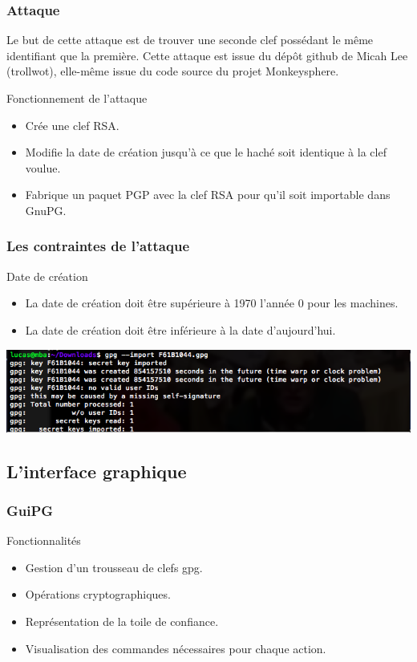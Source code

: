 \begin{frame}
  \frametitle{\color{white}Attaque}
  \begin{block}{ }
  Le but de cette attaque est de trouver une seconde clef possédant le même identifiant que la première. 
  Cette attaque est issue du dépôt github de Micah Lee (trollwot), elle-même issue du code source du projet Monkeysphere.
  \end{block}
  \begin{block}{Fonctionnement de l'attaque}
      \begin{itemize}
        \item Crée une clef RSA.
        \item Modifie la date de création jusqu'à ce que le haché soit identique à la clef voulue.
        \item Fabrique un paquet PGP avec la clef RSA pour qu'il soit importable dans GnuPG.
      \end{itemize}
  \end{block}
\end{frame}

\begin{frame}
  \frametitle{\color{white}Les contraintes de l'attaque}
  \begin{block}{Date de création}
      \begin{itemize}
        \item La date de création doit être supérieure à 1970 l'année 0 pour les machines.
        \item La date de création doit être inférieure à la date d'aujourd'hui.
      \end{itemize}
    \end{block}
    \medbreak
    \includegraphics[scale=0.42]{attaque.png}
\end{frame}

\subsection{L'interface graphique}
\begin{frame}
    \frametitle{\color{white}GuiPG}
    \begin{block}{Fonctionnalités}
      \begin{itemize}
        \item Gestion d'un trousseau de clefs gpg.
        \item Opérations cryptographiques.
        \item Représentation de la toile de confiance.
        \item Visualisation des commandes nécessaires pour chaque action.
      \end{itemize}
    \end{block}
\end{frame}

